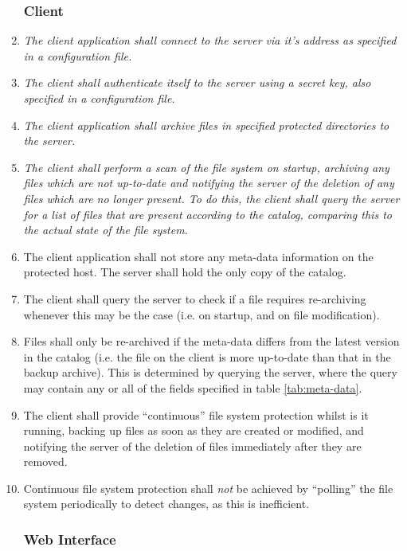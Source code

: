 \begin{enumerate}
\subsubsection{Client}

    \item \emph{The client application shall connect to the server via it's
        address as specified in a configuration file.}
    \item \emph{The client shall authenticate itself to the server using a
        secret key, also specified in a configuration file.}
    \item \emph{The client application shall archive files in specified
        protected directories to the server.}
    \item \emph{The client shall perform a scan of the file system on startup,
        archiving any files which are not up-to-date and notifying the server
        of the deletion of any files which are no longer present. To do this,
        the client shall query the server for a list of files that are present
        according to the catalog, comparing this to the actual state of the
        file system.}
    \item The client application shall not store any meta-data information on
        the protected host. The server shall hold the only copy of the catalog.
    \item The client shall query the server to check if a file requires
        re-archiving whenever this may be the case (i.e. on startup, and on
        file modification).
    \item Files shall only be re-archived if the meta-data differs from the
        latest version in the catalog (i.e. the file on the client is more
        up-to-date than that in the backup archive). This is determined by
        querying the server, where the query may contain any or all of the
        fields specified in table \ref{tab:meta-data}.
    \item The client shall provide ``continuous'' file system protection whilst
        is it running, backing up files as soon as they are created or
        modified, and notifying the server of the deletion of files immediately
        after they are removed.
    \item Continuous file system protection shall \emph{not} be achieved by
        ``polling'' the file system periodically to detect changes, as this is
        inefficient.

\subsubsection{Web Interface}


\end{enumerate}
